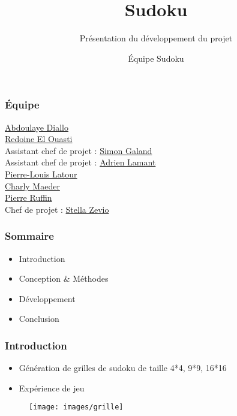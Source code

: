 \documentclass{beamer}
\begin{document}
	\title{Sudoku}
	\subtitle{Présentation du développement du projet}
	\author{Équipe Sudoku}	
	\date{}

	\maketitle


	\begin{frame}
	\frametitle{Équipe}
		\begin{centering}
			\href{mailto:abdoulaye.diallo@etud.univ-montp2.fr}{Abdoulaye Diallo}\\ 			\href{mailto:redoine.el-ouasti@etud.univ-montp2.fr}{Redoine El Ouasti}\\
			Assistant chef de projet : \href{mailto:simon.galand@etud.univ-montp2.fr}{Simon Galand}\\
			Assistant chef de projet : \href{mailto:adrien.lamant@etud.univ-montp2.fr}{Adrien Lamant}\\
			\href{mailto:pierre-louis.latour@etud.univ-montp2.fr}{Pierre-Louis Latour}\\
			\href{mailto:charly.maeder@etud.univ-montp2.fr}{Charly Maeder}\\
			\href{mailto:pierre.ruffin@etud.univ-montp2.fr}{Pierre Ruffin}\\ 
			Chef de projet : \href{mailto:stella.zevio@etud.univ-montp2.fr}{Stella Zevio}\\
		\end{centering}
	\end{frame}

	
	\begin{frame}
	\frametitle{Sommaire}
		\tableofcontents
		   \begin{itemize}
		   \item Introduction
		   \item Conception \& Méthodes
		   \item Développement
		   \item Conclusion
   		\end {itemize}
	\end{frame}



	\begin{frame}
	\frametitle{Introduction}
	\begin{itemize}
		\item Génération de grilles de sudoku de taille 4*4, 9*9, 16*16
		\item Expérience de jeu
	\end {itemize}

	\begin{figure}[H]
		\centering
		\texttt{[image: images/grille]}
	\end{figure}
	\end{frame}
\end{document}
